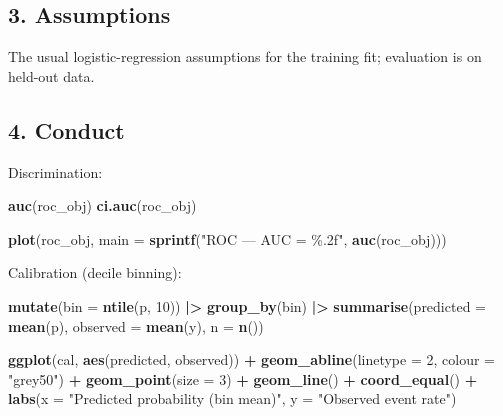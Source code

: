 \documentclass[
]{article}
\newenvironment{Shaded}{\begin{snugshade}}{\end{snugshade}}
\newcommand{\AttributeTok}[1]{\textcolor[rgb]{0.13,0.29,0.53}{#1}}
\newcommand{\DecValTok}[1]{\textcolor[rgb]{0.00,0.00,0.81}{#1}}
\newcommand{\FunctionTok}[1]{\textcolor[rgb]{0.13,0.29,0.53}{\textbf{#1}}}
\newcommand{\NormalTok}[1]{#1}
\newcommand{\SpecialCharTok}[1]{\textcolor[rgb]{0.81,0.36,0.00}{\textbf{#1}}}
\newcommand{\StringTok}[1]{\textcolor[rgb]{0.31,0.60,0.02}{#1}}
\begin{document}
\subsection{3. Assumptions}\label{assumptions}

The usual logistic-regression assumptions for the training fit;
evaluation is on held-out data.

\subsection{4. Conduct}\label{conduct}

Discrimination:

\begin{Shaded}
\begin{Highlighting}[]
\FunctionTok{auc}\NormalTok{(roc\_obj)}
\FunctionTok{ci.auc}\NormalTok{(roc\_obj)}

\FunctionTok{plot}\NormalTok{(roc\_obj, }\AttributeTok{main =} \FunctionTok{sprintf}\NormalTok{(}\StringTok{"ROC — AUC = \%.2f"}\NormalTok{, }\FunctionTok{auc}\NormalTok{(roc\_obj)))}
\end{Highlighting}
\end{Shaded}

Calibration (decile binning):

\begin{Shaded}
\begin{Highlighting}[]
  \FunctionTok{mutate}\NormalTok{(}\AttributeTok{bin =} \FunctionTok{ntile}\NormalTok{(p, }\DecValTok{10}\NormalTok{)) }\SpecialCharTok{|\textgreater{}}
  \FunctionTok{group\_by}\NormalTok{(bin) }\SpecialCharTok{|\textgreater{}}
  \FunctionTok{summarise}\NormalTok{(}\AttributeTok{predicted =} \FunctionTok{mean}\NormalTok{(p), }\AttributeTok{observed =} \FunctionTok{mean}\NormalTok{(y), }\AttributeTok{n =} \FunctionTok{n}\NormalTok{())}

\FunctionTok{ggplot}\NormalTok{(cal, }\FunctionTok{aes}\NormalTok{(predicted, observed)) }\SpecialCharTok{+}
  \FunctionTok{geom\_abline}\NormalTok{(}\AttributeTok{linetype =} \DecValTok{2}\NormalTok{, }\AttributeTok{colour =} \StringTok{"grey50"}\NormalTok{) }\SpecialCharTok{+}
  \FunctionTok{geom\_point}\NormalTok{(}\AttributeTok{size =} \DecValTok{3}\NormalTok{) }\SpecialCharTok{+}
  \FunctionTok{geom\_line}\NormalTok{() }\SpecialCharTok{+}
  \FunctionTok{coord\_equal}\NormalTok{() }\SpecialCharTok{+}
  \FunctionTok{labs}\NormalTok{(}\AttributeTok{x =} \StringTok{"Predicted probability (bin mean)"}\NormalTok{,}
       \AttributeTok{y =} \StringTok{"Observed event rate"}\NormalTok{)}
\end{Highlighting}
\end{Shaded}
\end{document}
